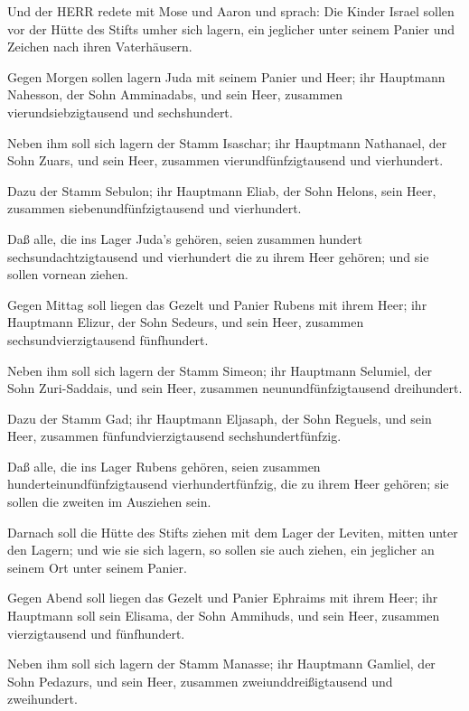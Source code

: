  Und der HERR redete mit Mose und Aaron und sprach:
 Die Kinder Israel sollen vor der Hütte des Stifts umher
sich lagern, ein jeglicher unter seinem Panier und Zeichen nach ihren
Vaterhäusern.

 Gegen Morgen sollen lagern Juda mit seinem Panier und Heer;
ihr Hauptmann Nahesson, der Sohn Amminadabs,  und sein Heer,
zusammen vierundsiebzigtausend und sechshundert.

 Neben ihm soll sich lagern der Stamm Isaschar; ihr
Hauptmann Nathanael, der Sohn Zuars,  und sein Heer,
zusammen vierundfünfzigtausend und vierhundert.

 Dazu der Stamm Sebulon; ihr Hauptmann Eliab, der Sohn
Helons,  sein Heer, zusammen siebenundfünfzigtausend und
vierhundert.

 Daß alle, die ins Lager Juda's gehören, seien zusammen
hundert sechsundachtzigtausend und vierhundert die zu ihrem Heer
gehören; und sie sollen vornean ziehen.

 Gegen Mittag soll liegen das Gezelt und Panier Rubens mit
ihrem Heer; ihr Hauptmann Elizur, der Sohn Sedeurs,  und
sein Heer, zusammen sechsundvierzigtausend fünfhundert.

 Neben ihm soll sich lagern der Stamm Simeon; ihr Hauptmann
Selumiel, der Sohn Zuri-Saddais,  und sein Heer, zusammen
neunundfünfzigtausend dreihundert.

 Dazu der Stamm Gad; ihr Hauptmann Eljasaph, der Sohn
Reguels,  und sein Heer, zusammen fünfundvierzigtausend
sechshundertfünfzig.

 Daß alle, die ins Lager Rubens gehören, seien zusammen
hunderteinundfünfzigtausend vierhundertfünfzig, die zu ihrem Heer
gehören; sie sollen die zweiten im Ausziehen sein.

 Darnach soll die Hütte des Stifts ziehen mit dem Lager der
Leviten, mitten unter den Lagern; und wie sie sich lagern, so sollen sie
auch ziehen, ein jeglicher an seinem Ort unter seinem Panier.

 Gegen Abend soll liegen das Gezelt und Panier Ephraims mit
ihrem Heer; ihr Hauptmann soll sein Elisama, der Sohn Ammihuds,
 und sein Heer, zusammen vierzigtausend und fünfhundert.

 Neben ihm soll sich lagern der Stamm Manasse; ihr
Hauptmann Gamliel, der Sohn Pedazurs,  und sein Heer,
zusammen zweiunddreißigtausend und zweihundert.

